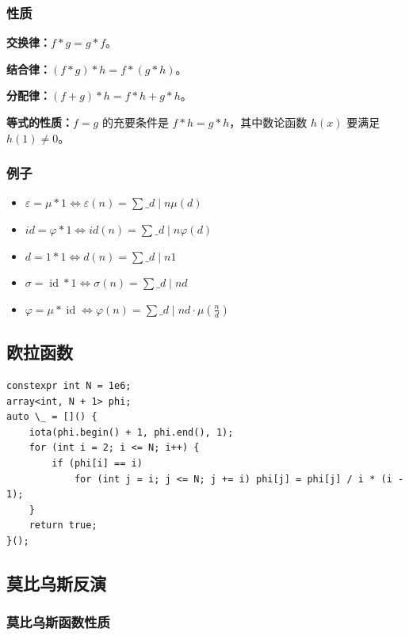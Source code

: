 \documentclass[UTF8]{ctexart}
\begin{document}
\begin{sloppypar}
\subsubsection{性质}

\textbf{交换律：}$f*g=g*f$。

\textbf{结合律：}$(f*g)*h=f*(g*h)$。

\textbf{分配律：}$(f+g)*h=f*h+g*h$。

\textbf{等式的性质：}$f=g$ 的充要条件是 $f*h=g*h$，其中数论函数 $h(x)$ 要满足 $h(1)\ne 0$。

\subsubsection{例子}

\begin{itemize}
   \item $\varepsilon=\mu \ast 1\iff\varepsilon(n)=\sum\_{d\mid n}\mu(d)$
   \item $id = \varphi * 1 \iff id(n)=\sum\_{d\mid n} \varphi(d)$
   \item $d=1 \ast 1\iff d(n)=\sum\_{d\mid n}1$
   \item $\sigma=\operatorname{id} \ast 1\iff\sigma(n)=\sum\_{d\mid n}d$
   \item $\varphi=\mu \ast \operatorname{id}\iff\varphi(n)=\sum\_{d\mid n}d\cdot\mu(\frac{n}{d})$
\end{itemize}

\subsection{欧拉函数}

\begin{lstlisting}[style=cpp]
constexpr int N = 1e6;
array<int, N + 1> phi;
auto \_ = []() {
    iota(phi.begin() + 1, phi.end(), 1);
    for (int i = 2; i <= N; i++) {
        if (phi[i] == i)
            for (int j = i; j <= N; j += i) phi[j] = phi[j] / i * (i - 1);
    }
    return true;
}();
\end{lstlisting}

\subsection{莫比乌斯反演}

\subsubsection{莫比乌斯函数性质}


\end{sloppypar}
\end{document}
